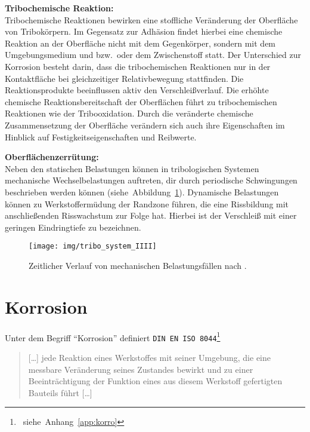 \documentclass[12pt,a4paper,bibliography=totocnumbered,listof=totocnumbered,fleqn]{scrartcl}
\newenvironment{myquote}{\begin{quote} \small}{\end{quote}}
\begin{document}
\textbf{Tribochemische Reaktion:}\\
Tribochemische Reaktionen bewirken eine stoffliche Veränderung der Oberfläche von Tribokörpern.
Im Gegensatz zur Adhäsion findet hierbei eine chemische Reaktion an der Oberfläche nicht mit dem Gegenkörper, sondern mit dem Umgebungsmedium und bzw.\ oder dem Zwischenstoff statt.
Der Unterschied zur Korrosion besteht darin, dass die tribochemischen Reaktionen nur in der Kontaktfläche bei gleichzeitiger Relativbewegung stattfinden.
Die Reaktionsprodukte beeinflussen aktiv den Verschleißverlauf.
Die erhöhte chemische Reaktionsbereitschaft der Oberflächen führt zu tribochemischen Reaktionen wie der Tribooxidation.
Durch die veränderte chemische Zusammensetzung der Oberfläche verändern sich auch ihre Eigenschaften im Hinblick auf Festigkeitseigenschaften und Reibwerte.

\pagebreak

\textbf{Oberflächenzerrütung:}\\
Neben den statischen Belastungen können in tribologischen Systemen mechanische Wechselbelastungen auftreten, dir durch periodische Schwingungen beschrieben werden können (siehe~Abbildung~\ref{fig:wechsel}).
Dynamische Belastungen können zu Werkstoffermüdung der Randzone führen, die eine Rissbildung mit anschließenden Risswachstum zur Folge hat.
Hierbei ist der Verschleiß mit einer geringen Eindringtiefe zu bezeichnen.

\begin{figure}[h]
\centering
\texttt{[image: img/tribo\_system\_IIII]}
\caption{Zeitlicher Verlauf von mechanischen Belastungsfällen nach \citep{bobzin2013oberflchentechnik}.}
\label{fig:wechsel}
\end{figure}

\pagebreak
\section{Korrosion}
\label{cha:korkor}

Unter dem Begriff \enquote{Korrosion} definiert \texttt{DIN EN ISO 8044}\footnote{~siehe~Anhang~\ref{app:korro}} 

\begin{myquote}
[\ldots] jede Reaktion eines Werkstoffes mit seiner Umgebung, die eine messbare Veränderung seines Zustandes bewirkt und zu einer Beeinträchtigung der Funktion eines aus diesem Werkstoff gefertigten Bauteils führt [\ldots]
\end{myquote}
\end{document}
